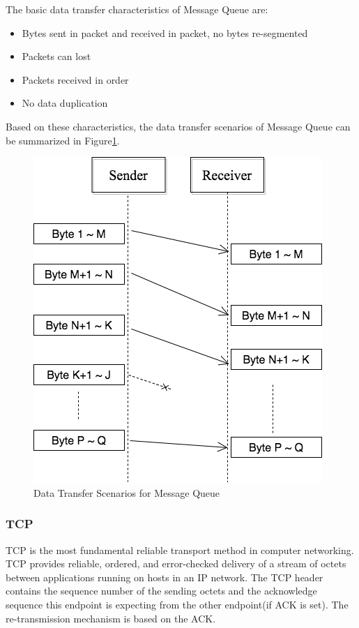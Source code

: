 The basic data transfer characteristics of Message Queue are:
\begin{itemize}
  \item Bytes sent in packet and received in packet, no bytes re-segmented
  \item Packets can lost
  \item Packets received in order
  \item No data duplication
\end{itemize}
Based on these characteristics, the data transfer scenarios of Message Queue can be summarized in Figure\ref{msmq}.
\begin{figure}[H]
\centerline{\includegraphics[scale=0.48]{Figures/msmq}}
\caption{Data Transfer Scenarios for Message Queue}
\label{msmq}
\end{figure}

\subsubsection{TCP}
TCP is the most fundamental reliable transport method in computer networking. TCP provides reliable, ordered, and error-checked delivery of a stream of octets between applications running on hosts in an IP network. The TCP header contains the sequence number of the sending octets and the acknowledge sequence this endpoint is expecting from the other endpoint(if ACK is set). The re-transmission mechanism is based on the ACK. 

